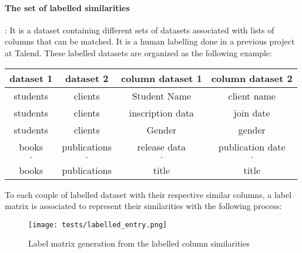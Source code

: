 \paragraph{The set of labelled similarities}:
\label{parag:labelled_ds}
It is a dataset containing
different sets of datasets associated with lists of columns that can be matched.
It is a human labelling done in a previous project at Talend. These labelled
datasets are organized as the following example:
\begin{center}
    \begin{tabular}{|c | c | c | c|}
        \hline
        \textbf{dataset 1} & \textbf{dataset 2} & \textbf{column dataset 1} &
        \textbf{column dataset 2}
        \\
        \hline
        students           & clients            & Student Name              &
        client name                                                           \\
        \hline
        students           & clients            & inscription data          &
        join date                                                             \\
        \hline
        students           & clients            & Gender                    &
        gender                                                                \\
        \hline
        books              & publications       & release data              &
        publication date                                                      \\
        \hline
        $\cdot$            & $\cdot$            & $\cdot$                   &
        $\cdot$                                                               \\
        \hline
        books              & publications       & title                     &
        title                                                                 \\
        \hline
    \end{tabular}
\end{center}

To each couple of labelled dataset with their respective similar columns, a
label matrix is associated to represent their similarities with the following
process:

\begin{figure}[h]
    \centering
    \texttt{[image: tests/labelled\_entry.png]}
    \caption{Label matrix generation from the labelled column similarities}
    \label{fig:label_matrix}
\end{figure}



